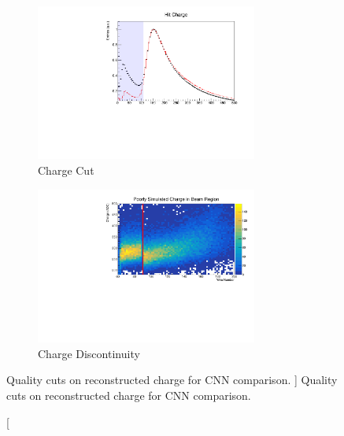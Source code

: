 \begin{figure}

	\begin{subfigure}[b]{\textwidth}
		\centering
		\includegraphics[width=0.8\textwidth]{figures/charge_nocuts.pdf}
		\caption {Charge Cut}
		\label{fig:charge_cuts}
	\end{subfigure}

	\begin{subfigure}[b]{\textwidth}
		\centering
		\includegraphics[width=0.8\textwidth]{figures/charge_discontinuity.pdf}
		\caption {Charge Discontinuity}
		\label{fig:90_wires_charge}
	\end{subfigure}

	\caption 
	[ Quality cuts on reconstructed charge for CNN comparison. ]
	{ Quality cuts on reconstructed charge for CNN comparison. }
	\label{fig:cnn_cuts_charge}

\end{figure}

